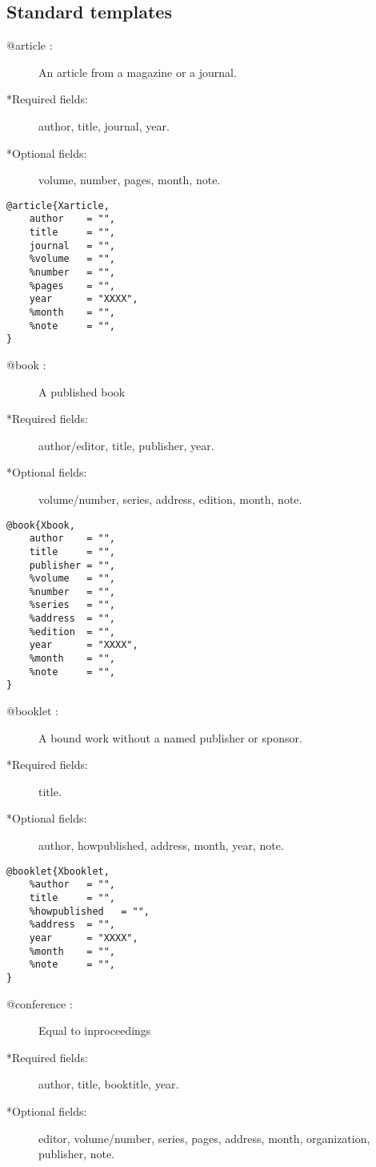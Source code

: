 \subsection{Standard templates}
\begin{description}
\item[@article :] An article from a magazine or a journal.
\item[*Required fields:] author, title, journal, year.
\item[*Optional fields:] volume, number, pages, month, note.
\end{description}

\begin{lstlisting}
@article{Xarticle,
    author    = "",
    title     = "",
    journal   = "",
    %volume   = "",
    %number   = "",
    %pages    = "",
    year      = "XXXX",
    %month    = "",
    %note     = "",
}
\end{lstlisting}
\begin{description}
\item[@book :] A published book
\item[*Required fields:] author/editor, title, publisher, year.
\item[*Optional fields:] volume/number, series, address, edition, month, note.
\end{description}
\begin{lstlisting}
@book{Xbook,
    author    = "",
    title     = "",
    publisher = "",
    %volume   = "",
    %number   = "",
    %series   = "",
    %address  = "",
    %edition  = "",
    year      = "XXXX",
    %month    = "",
    %note     = "",
}
\end{lstlisting}
\begin{description}
\item[@booklet :] A bound work without a named publisher or sponsor.
\item[*Required fields:] title.
\item[*Optional fields:] author, howpublished, address, month, year, note.
\end{description}
\begin{lstlisting}
@booklet{Xbooklet,
    %author   = "",
    title     = "",
    %howpublished   = "",
    %address  = "",
    year      = "XXXX",
    %month    = "",
    %note     = "",
}
\end{lstlisting}
\begin{description}
\item[@conference :] Equal to inproceedings
\item[*Required fields:] author, title, booktitle, year.
\item[*Optional fields:] editor, volume/number, series, pages, address, month, organization, publisher, note.
\end{description}
